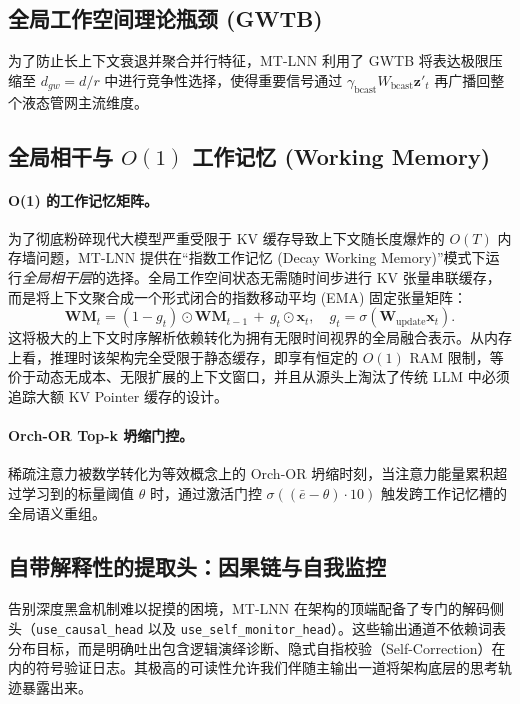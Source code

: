 \documentclass[11pt]{article}
\theoremstyle{definition}
\newcommand{\vx}{\mathbf{x}}
\newcommand{\sigmoid}{\sigma}
\begin{document}
\subsection{全局工作空间理论瓶颈 (GWTB)}
\label{sec:gwtb}

为了防止长上下文衰退并聚合并行特征，MT-LNN 利用了 GWTB 将表达极限压缩至 $d_{gw}=d/r$ 中进行竞争性选择，使得重要信号通过 $\gamma_\text{bcast} W_\text{bcast} \mathbf{z}'_t$ 再广播回整个液态管网主流维度。

\subsection{全局相干与 $O(1)$ 工作记忆 (Working Memory)}
\label{sec:coherence}

\paragraph{O(1) 的工作记忆矩阵。} 为了彻底粉碎现代大模型严重受限于 KV 缓存导致上下文随长度爆炸的 $O(T)$ 内存墙问题，MT-LNN 提供在“指数工作记忆 (Decay Working Memory)”模式下运行\emph{全局相干层}的选择。全局工作空间状态无需随时间步进行 KV 张量串联缓存，而是将上下文聚合成一个形式闭合的指数移动平均 (EMA) 固定张量矩阵：
\begin{equation}
   \mathbf{WM}_{t} = (1 - g_t) \odot \mathbf{WM}_{t-1} \,+\, g_t \odot \vx_t, \quad g_t = \sigmoid(\mathbf{W}_\text{update} \vx_t).
\end{equation}
这将极大的上下文时序解析依赖转化为拥有无限时间视界的全局融合表示。从内存上看，推理时该架构完全受限于静态缓存，即享有恒定的 $O(1)$ RAM 限制，等价于动态无成本、无限扩展的上下文窗口，并且从源头上淘汰了传统 LLM 中必须追踪大额 KV Pointer 缓存的设计。

\paragraph{Orch-OR Top-k 坍缩门控。} 
稀疏注意力被数学转化为等效概念上的 Orch-OR 坍缩时刻，当注意力能量累积超过学习到的标量阈值 $\theta$ 时，通过激活门控 $\sigmoid((\bar{e}-\theta)\cdot 10)$ 触发跨工作记忆槽的全局语义重组。

\subsection{自带解释性的提取头：因果链与自我监控}
\label{sec:extractors}

告别深度黑盒机制难以捉摸的困境，MT-LNN 在架构的顶端配备了专门的解码侧头（\texttt{use\_causal\_head} 以及 \texttt{use\_self\_monitor\_head}）。这些输出通道不依赖词表分布目标，而是明确吐出包含逻辑演绎诊断、隐式自指校验（Self-Correction）在内的符号验证日志。其极高的可读性允许我们伴随主输出一道将架构底层的思考轨迹暴露出来。
\end{document}
